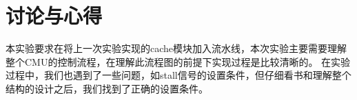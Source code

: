 \section{讨论与心得}
本实验要求在将上一次实验实现的cache模块加入流水线，本次实验主要需要理解整个CMU的控制流程，在理解此流程图的前提下实现过程是比较清晰的。
在实验过程中，我们也遇到了一些问题，如stall信号的设置条件，但仔细看书和理解整个结构的设计之后，我们找到了正确的设置条件。